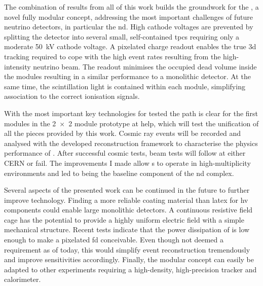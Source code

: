 The combination of results from all of this work builds the groundwork for the \AC{}, a novel fully modular \lartpc{} concept, addressing the most important challenges of future neutrino detectors, in particular the \dune{} \gls{nd}.
High cathode voltages are prevented by splitting the detector into several small, self-contained \glspl{tpc} requiring only a moderate \SI{50}{\kilo\volt} cathode voltage.
A pixelated charge readout enables the true \gls{3d} tracking required to cope with the high event rates resulting from the high-intensity neutrino beam.
The \AL{} readout minimises the occupied dead volume inside the modules resulting in a similar performance to a monolithic detector.
At the same time, the scintillation light is contained within each module, simplifying association to the correct ionisation signals.

With the most important key technologies for \AC{} tested the path is clear for the first modules in the \num{2 x 2} module prototype at \gls{help}, which will test the unification of all the pieces provided by this work.
Cosmic ray events will be recorded and analysed with the developed reconstruction framework to characterise the physics performance of \AC{}.
After successful cosmic tests, beam tests will follow at either CERN or \gls{fail}.
The improvements I made allow \lartpc{}s to operate in high-multiplicity environments and led to \AC{} being the baseline \lar{} component of the \dune{} \gls{nd} complex.

Several aspects of the presented work can be continued in the future to further improve \lartpc{} technology.
Finding a more reliable coating material than latex for \gls{hv} components could enable large monolithic detectors.
A continuous resistive field cage has the potential to provide a highly uniform electric field with a simple mechanical structure.
Recent tests indicate that the power dissipation of \larpix{} is low enough to make a pixelated \dune{} \gls{fd} conceivable.
Even though not deemed a requirement as of today, this would simplify event reconstruction tremendously and improve sensitivities accordingly.
Finally, the modular \AC{} concept can easily be adapted to other experiments requiring a high-density, high-precision tracker and calorimeter.